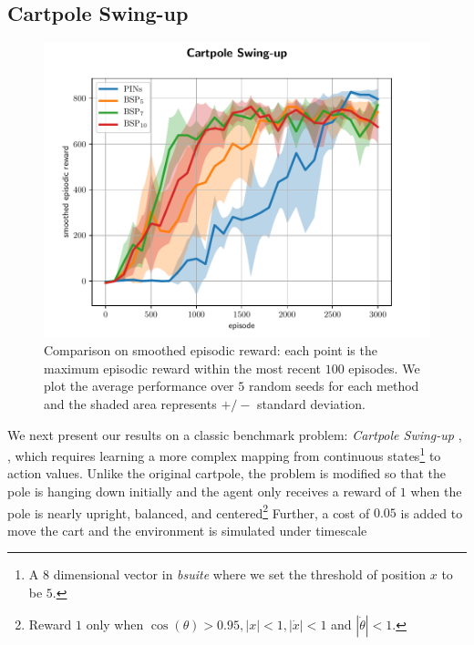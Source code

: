 \documentclass[letterpaper]{article} %
\newcommand{\abs}[1]{\left|#1\right|}
\theoremstyle{definition}
\begin{document}
\subsection{Cartpole Swing-up}
\begin{figure}[ht]
\centering
\includegraphics[width=1.0\linewidth]{cartpole_std_plot.pdf}
\caption{Comparison on smoothed episodic reward: each point is the maximum episodic reward within the most recent $100$ episodes. We plot the average performance over $5$ random seeds for each method and the shaded area represents $+/-$ standard deviation.}
\label{fig:cartpole_per}
\end{figure}

We next present our results on a classic benchmark problem: \textit{Cartpole Swing-up} \cite{sutton2018reinforcement}, \cite{osband2019bsuite}, which requires learning a more complex mapping from continuous states\footnote{A $8$ dimensional vector in \textit{bsuite} where we set the threshold of position $x$ to be $5$.} to action values. Unlike the original cartpole, the problem is modified so that the pole is hanging down initially and the agent only receives a reward of $1$ when the pole is nearly upright, balanced, and centered\footnote{Reward $1$ only when $\cos(\theta) > 0.95, \abs{x} < 1, \abs{\Dot{x}} < 1$ and $|\Dot{\theta}| < 1$.} Further, a cost of $0.05$ is added to move the cart and the environment is simulated under timescale
\end{document}
